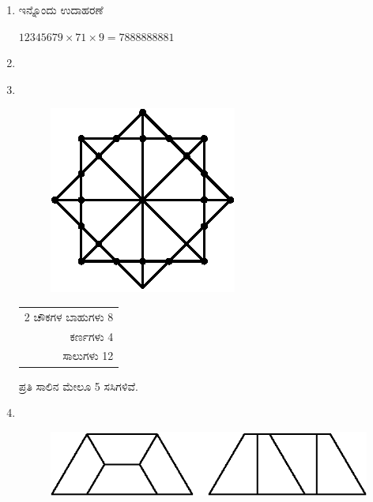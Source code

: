 \begin{enumerate}
\item ಇನ್ನೊಂದು ಉದಾಹರಣೆ 

$12345679\times 71\times 9 = 7888888881$

\smallskip
\item 
{\fontsize{10}{11}}

\medskip

\item 
~
\vskip -0.5cm

\begin{minipage}[c]{4cm}
\begin{figure}[H]
\centering
\includegraphics{images/chap9/ans20.eps}
\end{figure}
\end{minipage}
\qquad
\begin{minipage}[c]{5cm}
\begin{tabular}[t]{r}
2 ಚೌಕಗಳ ಬಾಹುಗಳು 8 \\
ಕರ್ಣಗಳು 4\\
\hline
ಸಾಲುಗಳು 12\\
\hline
\end{tabular}

ಪ್ರತಿ ಸಾಲಿನ ಮೇಲೂ 5 ಸಸಿಗಳಿವೆ. 
\end{minipage}

\smallskip
\smallskip

\item 
~

\vskip -0.5cm

\begin{figure}[H]
\centering
\includegraphics{images/chap9/ans21.eps}
\end{figure}


\end{enumerate}
